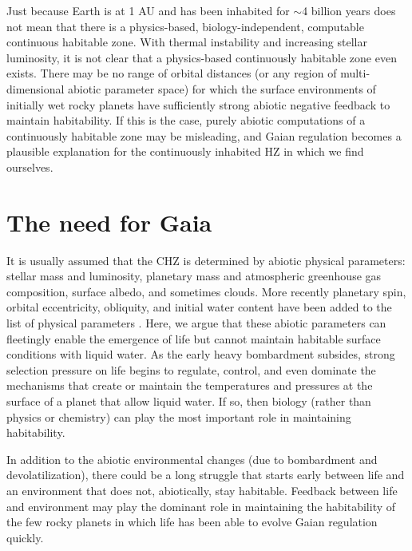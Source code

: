 Just because Earth is at 1 AU and has been inhabited for $\sim$4  billion years does not mean that there is a physics-based, biology-independent, computable continuous habitable zone. With thermal instability and increasing stellar luminosity, it is not clear that a physics-based continuously habitable zone even exists. There may be no range of orbital distances (or any region of multi-dimensional abiotic parameter space) for which the surface environments of initially wet rocky planets have sufficiently strong abiotic negative feedback to maintain habitability. If this is the case, purely abiotic computations of a continuously habitable zone may be misleading, and Gaian regulation becomes a plausible explanation for the continuously inhabited HZ in which we find ourselves.


\section{The need for Gaia}
\label{sec:biofeedbacks}

It is usually assumed that the CHZ is determined by abiotic physical parameters: stellar mass and luminosity, planetary mass and 
atmospheric greenhouse gas composition, surface albedo, and sometimes clouds. 
More recently planetary spin, orbital eccentricity, obliquity, and initial water content have been added to the list of physical parameters \citep[\eg,][]{Gonzalez2005,Gaidos2005,Lammer2009,Gudel2014b,Shields2015}. %
Here, we argue that these abiotic parameters can fleetingly enable the emergence of life but cannot maintain habitable surface conditions with liquid water.
As the early heavy bombardment subsides, strong selection pressure on life begins to regulate, control, and even dominate the mechanisms that 
create or maintain the temperatures and pressures at the surface of a planet that allow liquid water. If so, then biology (rather than physics or chemistry) can play the most important role in maintaining habitability.

In addition to the abiotic environmental changes (due to bombardment and devolatilization), there could be a long struggle that starts early between life and an environment that does not, abiotically, stay habitable. Feedback between life and environment may play the dominant role in maintaining the habitability of the few rocky planets in which life has been able to evolve Gaian regulation quickly.

